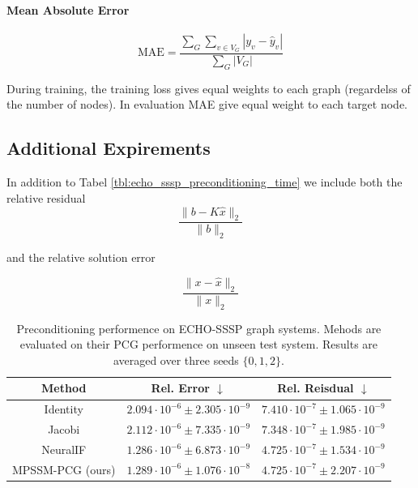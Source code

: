 \paragraph{Mean Absolute Error}
\begin{equation}\label{eq:mae}
    \text{MAE} = \frac{\sum_G \sum_{v\in V_G} |y_v - \hat y_v|}{\sum_{G} |V_G|}
\end{equation}

During training, the training loss gives equal weights to each graph
(regardelss of the number of nodes). In evaluation MAE give equal weight to
each target node.

\subsection{Additional Expirements}
In addition to Tabel \ref{tbl:echo_sssp_preconditioning_time} we include both the relative residual
\begin{equation}
    \frac{
        \lVert b - K\hat x\rVert_2
    } {
        \lVert b\rVert_2
    }
\end{equation}

and the relative solution error

\begin{equation}
    \frac{
        \lVert x - \hat x\rVert_2
    } {
        \lVert x\rVert_2
    }
\end{equation}

\begin{table}[H]
    \centering
    \caption{
        Preconditioning performence on ECHO-SSSP graph systems. Mehods are
        evaluated on their PCG performence on unseen test system. Results are
        averaged over three seeds $\{0,1,2\}$.
    }
    \small
    \label{tbl:echo_sssp_preconditioning_err}
    \begin{tabular}{c c c}
        Method           & Rel. Error  $\downarrow$                  & Rel. Reisdual  $\downarrow$               \\
        \hline
        Identity         & $2.094\cdot10^{-6}\pm2.305\cdot{10^{-9}}$ & $7.410\cdot10^{-7}\pm1.065\cdot{10^{-9}}$ \\
        Jacobi           & $2.112\cdot10^{-6}\pm7.335\cdot{10^{-9}}$ & $7.348\cdot10^{-7}\pm1.985\cdot{10^{-9}}$ \\
        NeuralIF         & $1.286\cdot10^{-6}\pm6.873\cdot{10^{-9}}$ & $4.725\cdot10^{-7}\pm1.534\cdot{10^{-9}}$ \\
        MPSSM-PCG (ours) & $1.289\cdot10^{-6}\pm1.076\cdot{10^{-8}}$ & $4.725\cdot10^{-7}\pm2.207\cdot{10^{-9}}$ \\
    \end{tabular}
\end{table}

